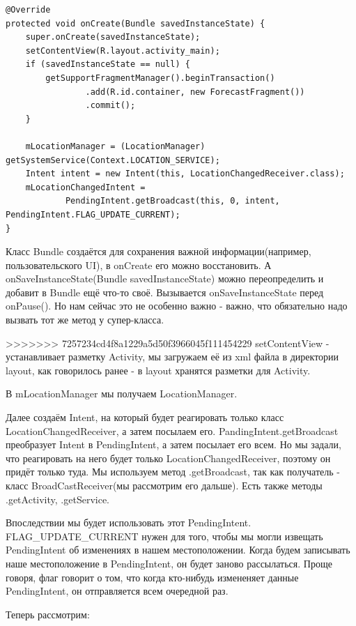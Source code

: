 \documentclass[12 pt]{article}
\begin{document}
    \begin{lstlisting}
@Override
protected void onCreate(Bundle savedInstanceState) {
    super.onCreate(savedInstanceState);
    setContentView(R.layout.activity_main);
    if (savedInstanceState == null) {
        getSupportFragmentManager().beginTransaction()
                .add(R.id.container, new ForecastFragment())
                .commit();
    }

    mLocationManager = (LocationManager) getSystemService(Context.LOCATION_SERVICE);
    Intent intent = new Intent(this, LocationChangedReceiver.class);
    mLocationChangedIntent =
            PendingIntent.getBroadcast(this, 0, intent, PendingIntent.FLAG_UPDATE_CURRENT);
}   
    \end{lstlisting}  
    
    Класс Bundle создаётся для сохранения важной информации(например, пользовательского UI), в onCreate его можно восстановить. А onSaveInstanceState(Bundle savedInstanceState) можно переопределить и добавит в Bundle ещё что-то своё. Вызывается onSaveInstanceState перед onPause(). Но нам сейчас это не особенно важно - важно, что обязательно надо вызвать тот же метод у супер-класса.
    
>>>>>>> 7257234cd4f8a1229a5d50f3966045f111454229
     setContentView - устанавливает разметку Activity, мы загружаем её из xml файла в директории layout, как говорилось ранее - в layout хранятся разметки для Activity.
     
     В mLocationManager мы получаем LocationManager.
     
     Далее создаём Intent, на который будет реагировать только класс LocationChangedReceiver, а затем посылаем его. PandingIntent.getBroadcast преобразует Intent в PendingIntent, а затем посылает его всем. Но мы задали, что реагировать на него будет только LocationChangedReceiver, поэтому он придёт только туда. Мы используем метод .getBroadcast, так как получатель - класс BroadCastReceiver(мы рассмотрим его дальше). Есть также методы .getActivity, .getService. 
     
     Впоследствии мы будет использовать этот PendingIntent. FLAG\_UPDATE\_CURRENT нужен для того, чтобы мы могли извещать PendingIntent об изменениях в нашем местоположении. Когда будем записывать наше местоположение в PendingIntent, он будет заново рассылаться. Проще говоря, флаг говорит о том, что когда кто-нибудь измененяет данные PendingIntent, он отправляется всем очередной раз.
     
     Теперь рассмотрим:
     
\end{document}
